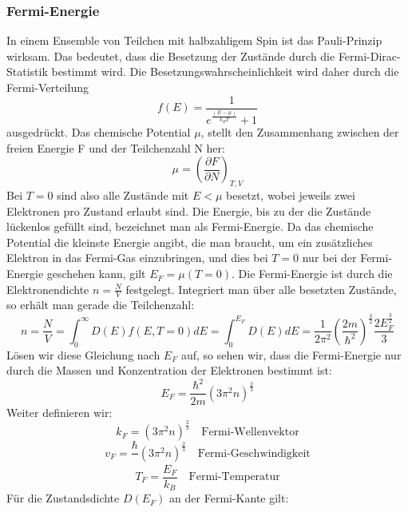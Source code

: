 \documentclass[11pt]{article}
\begin{document}
\subsubsection{Fermi-Energie}
In einem Ensemble von Teilchen mit halbzahligem Spin ist das Pauli-Prinzip
wirksam. Das bedeutet, dass die Besetzung der Zustände durch die Fermi-Dirac-
Statistik bestimmt wird. Die Besetzungswahrscheinlichkeit wird daher durch die
Fermi-Verteilung
\begin{equation}
  f(E)=\frac{1}{e^{\frac{(E-\mu)}{k_BT}}+1}
\end{equation}
ausgedrückt. Das chemische Potential $\mu$, stellt den Zusammenhang zwischen
der freien Energie F und der Teilchenzahl N her:
\begin{equation}
  \mu=\left(\frac{\partial F}{\partial N}\right)_{T,V}
\end{equation}
Bei $T=0$ sind also alle Zustände mit $E<\mu$ besetzt, wobei jeweils zwei
Elektronen pro Zustand erlaubt sind. Die Energie, bis zu der die Zustände
lückenlos gefüllt sind, bezeichnet man als Fermi-Energie. Da das chemische
Potential die kleinste Energie angibt, die man braucht, um ein zusätzliches
Elektron in das Fermi-Gas einzubringen, und dies bei $T=0$ nur bei der Fermi-
Energie geschehen kann, gilt $E_F=\mu(T=0)$. Die Fermi-Energie ist durch die
Elektronendichte $n=\frac{N}{V}$ festgelegt. Integriert man über alle besetzten
Zustände, so erhält man gerade die Teilchenzahl:
\begin{equation}
  n=\frac{N}{V}=\int_0^\infty D(E)f(E,T=0)dE=\int_0^{E_F}D(E)dE=\frac{1}{2\pi^2}
  \left( \frac{2m}{\hbar^2}\right)^{\frac{3}{2}}\frac{2E_F^{\frac{3}{2}}}{3}
\end{equation}
Lösen wir diese Gleichung nach $E_F$ auf, so sehen wir, dass die Fermi-Energie
nur durch die Massen und Konzentration der Elektronen bestimmt ist:
\begin{equation}
  E_F=\frac{\hbar^2}{2m}(3\pi^2n)^{\frac{2}{3}}
\end{equation}
Weiter definieren wir:
\begin{equation}
  k_F=(3\pi^2n)^{\frac{2}{3}}\quad \text{Fermi-Wellenvektor}
\end{equation}
\begin{equation}
  v_F=\frac{\hbar}{}(3\pi^2n)^{\frac{2}{3}}\quad \text{Fermi-Geschwindigkeit}
\end{equation}
\begin{equation}
  T_F=\frac{E_F}{k_B}\quad \text{Fermi-Temperatur}
\end{equation}
Für die Zustandsdichte $D(E_F)$ an der Fermi-Kante gilt:
\end{document}
